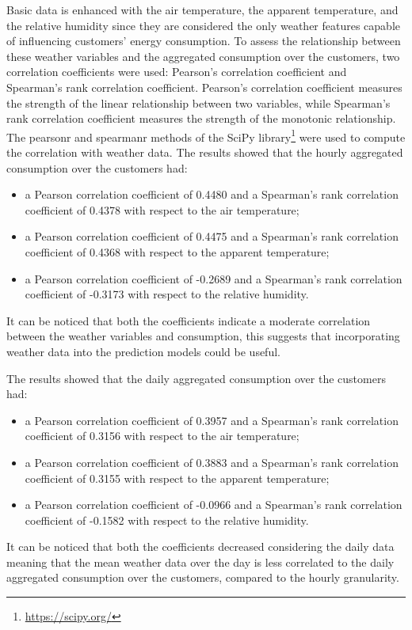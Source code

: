 Basic data is enhanced with the air temperature, the apparent temperature, and the relative humidity since they are considered the only weather features capable of influencing customers' energy consumption.
To assess the relationship between these weather variables and the aggregated consumption over the customers, two correlation coefficients were used: Pearson's correlation coefficient and Spearman's rank correlation coefficient.
Pearson's correlation coefficient measures the strength of the linear relationship between two variables, while Spearman's rank correlation coefficient measures the strength of the monotonic relationship.
The pearsonr and spearmanr methods of the SciPy library\footnote{ \url{https://scipy.org/} } were used to compute the correlation with weather data.
The results showed that the hourly aggregated consumption over the customers had:
\begin{itemize}
  \item a Pearson correlation coefficient of 0.4480 and a Spearman's rank correlation coefficient of 0.4378 with respect to the air temperature;
  \item a Pearson correlation coefficient of 0.4475 and a Spearman's rank correlation coefficient of 0.4368 with respect to the apparent temperature;
  \item a Pearson correlation coefficient of -0.2689 and a Spearman's rank correlation coefficient of -0.3173 with respect to the relative humidity.
\end{itemize}
It can be noticed that both the coefficients indicate a moderate correlation between the weather variables and consumption, this suggests that incorporating weather data into the prediction models could be useful.

The results showed that the daily aggregated consumption over the customers had:
\begin{itemize}
  \item a Pearson correlation coefficient of 0.3957 and a Spearman's rank correlation coefficient of 0.3156 with respect to the air temperature;
  \item a Pearson correlation coefficient of 0.3883 and a Spearman's rank correlation coefficient of 0.3155 with respect to the apparent temperature;
  \item a Pearson correlation coefficient of -0.0966 and a Spearman's rank correlation coefficient of -0.1582 with respect to the relative humidity.
\end{itemize}
It can be noticed that both the coefficients decreased considering the daily data meaning that the mean weather data over the day is less correlated to the daily aggregated consumption over the customers, compared to the hourly granularity.

